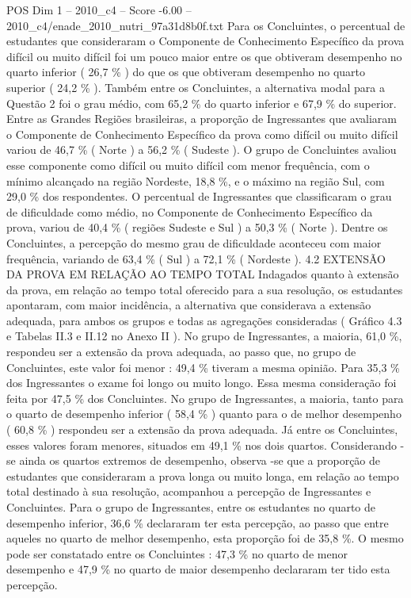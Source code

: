 \begin{textsample}{POS Dim 1 – 2010\_c4 – Score -6.00 – 2010\_c4/enade\_2010\_nutri\_97a31d8b0f.txt}
Para os Concluintes, o percentual de estudantes que consideraram o Componente de Conhecimento Específico da prova difícil ou muito difícil foi um pouco maior entre os que obtiveram desempenho no quarto inferior ( 26,7 \% ) do que os que obtiveram desempenho no quarto superior ( 24,2 \% ).
Também entre os Concluintes, a alternativa modal para a Questão 2 foi o grau médio, com 65,2 \% do quarto inferior e 67,9 \% do superior.
Entre as Grandes Regiões brasileiras, a proporção de Ingressantes que avaliaram o Componente de Conhecimento Específico da prova como difícil ou muito difícil variou de 46,7 \% ( Norte ) a 56,2 \% ( Sudeste ).
O grupo de Concluintes avaliou esse componente como difícil ou muito difícil com menor frequência, com o mínimo alcançado na região Nordeste, 18,8 \%, e o máximo na região Sul, com 29,0 \% dos respondentes.
O percentual de Ingressantes que classificaram o grau de dificuldade como médio, no Componente de Conhecimento Específico da prova, variou de 40,4 \% ( regiões Sudeste e Sul ) a 50,3 \% ( Norte ).
Dentre os Concluintes, a percepção do mesmo grau de dificuldade aconteceu com maior frequência, variando de 63,4 \% ( Sul ) a 72,1 \% ( Nordeste ). 4.2 EXTENSÃO DA PROVA EM RELAÇÃO AO TEMPO TOTAL Indagados quanto à extensão da prova, em relação ao tempo total oferecido para a sua resolução, os estudantes apontaram, com maior incidência, a alternativa que considerava a extensão adequada, para ambos os grupos e todas as agregações consideradas ( Gráfico 4.3 e Tabelas II.3 e II.12 no Anexo II ).
No grupo de Ingressantes, a maioria, 61,0 \%, respondeu ser a extensão da prova adequada, ao passo que, no grupo de Concluintes, este valor foi menor : 49,4 \% tiveram a mesma opinião.
Para 35,3 \% dos Ingressantes o exame foi longo ou muito longo.
Essa mesma consideração foi feita por 47,5 \% dos Concluintes.
No grupo de Ingressantes, a maioria, tanto para o quarto de desempenho inferior ( 58,4 \% ) quanto para o de melhor desempenho ( 60,8 \% ) respondeu ser a extensão da prova adequada.
Já entre os Concluintes, esses valores foram menores, situados em 49,1 \% nos dois quartos.
Considerando -se ainda os quartos extremos de desempenho, observa -se que a proporção de estudantes que consideraram a prova longa ou muito longa, em relação ao tempo total destinado à sua resolução, acompanhou a percepção de Ingressantes e Concluintes.
Para o grupo de Ingressantes, entre os estudantes no quarto de desempenho inferior, 36,6 \% declararam ter esta percepção, ao passo que entre aqueles no quarto de melhor desempenho, esta proporção foi de 35,8 \%.
O mesmo pode ser constatado entre os Concluintes : 47,3 \% no quarto de menor desempenho e 47,9 \% no quarto de maior desempenho declararam ter tido esta percepção.

\end{textsample}
